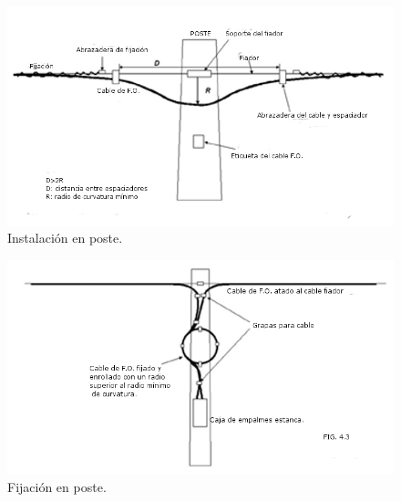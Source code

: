 \documentclass[12pt,letterpaper]{article}
\begin{document}
\newpage
\begin{figure}[ht]
    \centering
    \includegraphics[width=.8\textwidth]{imagenes/ta1.jpg}
    \caption{Instalación en poste.}
\end{figure}

\begin{figure}[ht]
    \centering
    \includegraphics[width=.8\textwidth]{imagenes/ta2.jpg}
    \caption{Fijación en poste.}
\end{figure}

\newpage
\end{document}
